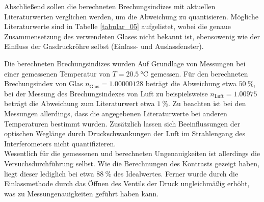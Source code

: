 Abschließend sollen die berechneten Brechungsindizes mit aktuellen
Literaturwerten verglichen werden, um die Abweichung zu quantisieren. Mögliche
Literaturwerte sind in Tabelle \ref{tabular_05} aufgelistet, wobei die genaue
Zusammensetzung des verwendeten Glases nicht bekannt ist, ebensowenig wie der
Einfluss der Gasdruckröhre selbst (Einlass- und Auslassfenster). \\
\FloatBarrier

\FloatBarrier
\noindent Die berechneten Brechungsindizes wurden Auf Grundlage von Messungen bei
einer gemessenen Temperatur von $T = \SI{20.5}{\celsius}$ gemessen. Für den
berechneten Brechungsindex von Glas $n_\text{Glas} = \num{1.00000128}$ beträgt
die Abweichung etwa $\SI{50}{\percent}$, bei der Messung des Brechungsindexes
von Luft zu beispielsweise $n_\text{Luft} = \num{1.00975}$ beträgt die
Abweichung zum Literaturwert etwa $\SI{1}{\percent}$. Zu beachten ist bei den
Messungen allerdings, dass die angegebenen Literaturwerte bei anderen
Temperaturen bestimmt wurden. Zusätzlich lassen sich Beeinflussungen der
optischen Weglänge durch Druckschwankungen der Luft im Strahlengang des
Interferometers nicht quantifizieren. \\
\noindent Wesentlich für die gemessenen und berechneten Ungenauigkeiten ist
allerdings die Versuchsdurchführung selbst. Wie die Berechnungen des Kontrasts
gezeigt haben, liegt dieser lediglich bei etwa $\SI{88}{\percent}$ des
Idealwertes. Ferner wurde durch die Einlassmethode durch das Öffnen des Ventils
der Druck ungleichmäßig erhöht, was zu Messungenauigkeiten geführt haben kann.
